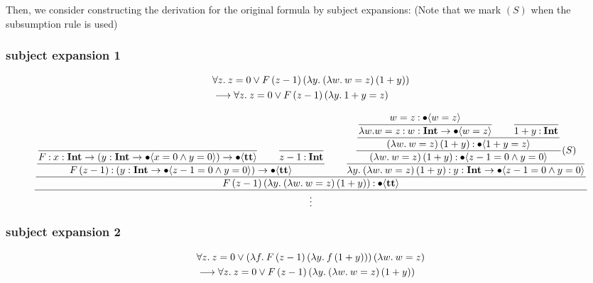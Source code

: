 \documentclass{article}
\begin{document}
Then, we consider constructing the derivation for the original formula by subject expansions:
(Note that we mark \( (S) \) when the subsumption rule is used)
\subsubsection{subject expansion 1}
\begin{align*}
    &\forall z.\: z=0 \vee F\, (z-1) \,(\lambda y.\: (\lambda w.\: w = z)\,(1+y))\\
    &\longrightarrow \forall z.\: z=0 \vee F\, (z-1)\, (\lambda y.\: 1+y = z)
\end{align*}

\begin{equation*}
    \dfrac{
    \dfrac{
        \dfrac{
            \dfrac{
            }{
            F \mathbin{:} {x} : \textbf{Int} \to ({y} : \textbf{Int} \to \bullet \langle x = 0 \wedge y = 0 \rangle) \to \bullet \langle \textbf{tt} \rangle
            }
            \qquad
            \dfrac{}{
            z - 1 \mathbin{:} \textbf{Int}
            }
        }{
            F\, (z-1) \mathbin{:} ({y} : \textbf{Int} \to \bullet \langle z-1 = 0 \wedge y = 0 \rangle) \to \bullet \langle \textbf{tt} \rangle
        }
        \qquad
        \dfrac{
            \dfrac{
                \dfrac{
                    \dfrac{
                        w = z \mathbin{:} \bullet \langle  w = z \rangle
                    }{
                        \lambda w. w = z \mathbin{:} {w} : \textbf{Int} \to \bullet \langle w=z \rangle
                    }
                    \qquad
                    \dfrac{}{
                        1 + y \mathbin{:} \textbf{Int}
                    }
                }{
                    (\lambda w.\: w = z)\,(1+y) \mathbin{:} \bullet \langle 1+y=z \rangle
                }
            }{
                (\lambda w.\: w = z)\,(1+y) \mathbin{:} \bullet \langle z-1 = 0 \wedge y = 0 \rangle
            }(S)
        }{
            \lambda y.\: (\lambda w.\: w = z)\,(1+y) \mathbin{:} {y} : \textbf{Int} \to \bullet \langle z-1 = 0 \wedge y = 0 \rangle
        }
    }{
        F\, (z-1) \,(\lambda y.\: (\lambda w.\: w = z)\,(1+y)) \mathbin{:} \bullet \langle \textbf{tt} \rangle
    }
    }{\vdots}
\end{equation*}

\subsubsection{subject expansion 2}
\begin{align*}
    &\forall z.\: z=0\vee (\lambda f.\: F\, (z-1)\, (\lambda y.\: f\,(1+y)))\, (\lambda w.\: w = z) \\
    &\longrightarrow \forall z.\: z=0 \vee F\, (z-1) \,(\lambda y.\: (\lambda w.\: w = z)\,(1+y))
\end{align*}
\end{document}
